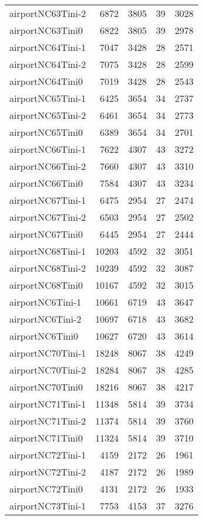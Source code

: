 \begin{longtable}{lrrrr}
airportNC63Tini-2 & 6872 & 3805 & 39 & 3028 \\
airportNC63Tini0 & 6822 & 3805 & 39 & 2978 \\
airportNC64Tini-1 & 7047 & 3428 & 28 & 2571 \\
airportNC64Tini-2 & 7075 & 3428 & 28 & 2599 \\
airportNC64Tini0 & 7019 & 3428 & 28 & 2543 \\
airportNC65Tini-1 & 6425 & 3654 & 34 & 2737 \\
airportNC65Tini-2 & 6461 & 3654 & 34 & 2773 \\
airportNC65Tini0 & 6389 & 3654 & 34 & 2701 \\
airportNC66Tini-1 & 7622 & 4307 & 43 & 3272 \\
airportNC66Tini-2 & 7660 & 4307 & 43 & 3310 \\
airportNC66Tini0 & 7584 & 4307 & 43 & 3234 \\
airportNC67Tini-1 & 6475 & 2954 & 27 & 2474 \\
airportNC67Tini-2 & 6503 & 2954 & 27 & 2502 \\
airportNC67Tini0 & 6445 & 2954 & 27 & 2444 \\
airportNC68Tini-1 & 10203 & 4592 & 32 & 3051 \\
airportNC68Tini-2 & 10239 & 4592 & 32 & 3087 \\
airportNC68Tini0 & 10167 & 4592 & 32 & 3015 \\
airportNC6Tini-1 & 10661 & 6719 & 43 & 3647 \\
airportNC6Tini-2 & 10697 & 6718 & 43 & 3682 \\
airportNC6Tini0 & 10627 & 6720 & 43 & 3614 \\
airportNC70Tini-1 & 18248 & 8067 & 38 & 4249 \\
airportNC70Tini-2 & 18284 & 8067 & 38 & 4285 \\
airportNC70Tini0 & 18216 & 8067 & 38 & 4217 \\
airportNC71Tini-1 & 11348 & 5814 & 39 & 3734 \\
airportNC71Tini-2 & 11374 & 5814 & 39 & 3760 \\
airportNC71Tini0 & 11324 & 5814 & 39 & 3710 \\
airportNC72Tini-1 & 4159 & 2172 & 26 & 1961 \\
airportNC72Tini-2 & 4187 & 2172 & 26 & 1989 \\
airportNC72Tini0 & 4131 & 2172 & 26 & 1933 \\
airportNC73Tini-1 & 7753 & 4153 & 37 & 3276 \\

\end{longtable}
